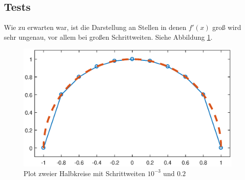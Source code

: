 \documentclass[a4paper,11pt,bibliography=totoc,listof=totoc,headinclude=true,cleardoublepage=empty,oneside]{scrartcl}
\begin{document}
\subsection{Tests}
Wie zu erwarten war, ist die Darstellung an Stellen in denen $f'(x)$ groß wird sehr ungenau, vor allem bei großen Schrittweiten. Siehe Abbildung \ref{fig:Halbkreis_a}.
\begin{figure}[h]
\centering
\includegraphics[width=0.85\linewidth]{plots/A/Halbkreis.eps}
\caption{Plot zweier Halbkreise mit Schrittweiten $10^{-3}$ und $0.2$}
\label{fig:Halbkreis_a}
\end{figure}
\end{document}
